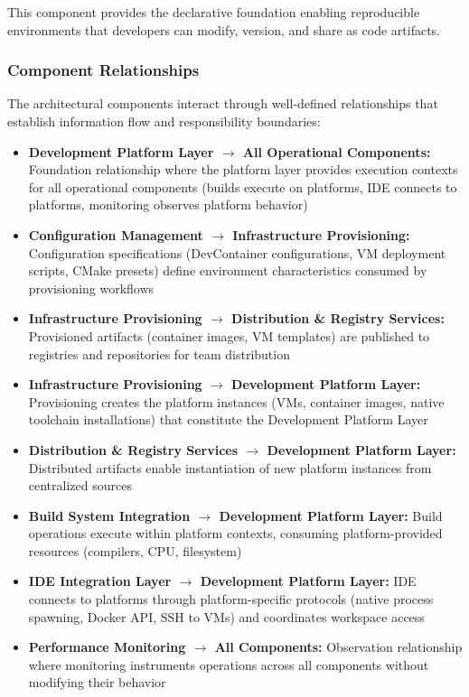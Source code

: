 This component provides the declarative foundation enabling reproducible environments that developers can modify, version, and share as code artifacts.

\subsubsection{Component Relationships}

The architectural components interact through well-defined relationships that establish information flow and responsibility boundaries:

\begin{itemize}
\item \textbf{Development Platform Layer $\rightarrow$ All Operational Components:} Foundation relationship where the platform layer provides execution contexts for all operational components (builds execute on platforms, IDE connects to platforms, monitoring observes platform behavior)
\item \textbf{Configuration Management $\rightarrow$ Infrastructure Provisioning:} Configuration specifications (DevContainer configurations, VM deployment scripts, CMake presets) define environment characteristics consumed by provisioning workflows
\item \textbf{Infrastructure Provisioning $\rightarrow$ Distribution \& Registry Services:} Provisioned artifacts (container images, VM templates) are published to registries and repositories for team distribution
\item \textbf{Infrastructure Provisioning $\rightarrow$ Development Platform Layer:} Provisioning creates the platform instances (VMs, container images, native toolchain installations) that constitute the Development Platform Layer
\item \textbf{Distribution \& Registry Services $\rightarrow$ Development Platform Layer:} Distributed artifacts enable instantiation of new platform instances from centralized sources
\item \textbf{Build System Integration $\rightarrow$ Development Platform Layer:} Build operations execute within platform contexts, consuming platform-provided resources (compilers, CPU, filesystem)
\item \textbf{IDE Integration Layer $\rightarrow$ Development Platform Layer:} IDE connects to platforms through platform-specific protocols (native process spawning, Docker API, SSH to VMs) and coordinates workspace access
\item \textbf{Performance Monitoring $\rightarrow$ All Components:} Observation relationship where monitoring instruments operations across all components without modifying their behavior
\end{itemize}

